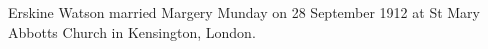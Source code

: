 
Erskine Watson married Margery Munday on 28 September 1912 at St Mary Abbotts Church in	Kensington, London.


